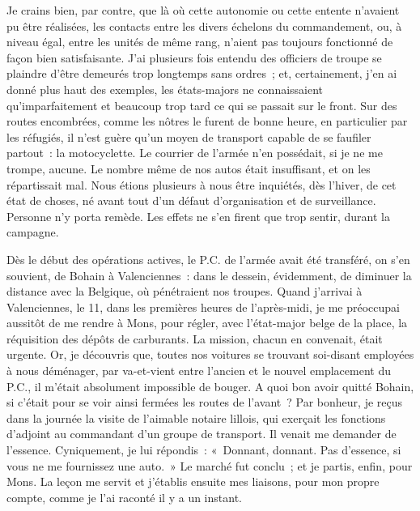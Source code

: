 \documentclass[french,twoside]{book} %
\begin{document}
Je crains bien, par contre, que là où cette autonomie ou cette entente n’avaient pu être réalisées, les contacts entre les divers échelons du commandement, ou, à niveau égal, entre les unités de même rang, n’aient pas toujours fonctionné de façon bien satisfaisante. J’ai plusieurs fois entendu des officiers de troupe se plaindre d’être demeurés trop longtemps sans ordres ; et, certainement, j’en ai donné plus haut des exemples, les états-majors ne   connaissaient qu’imparfaitement et beaucoup trop tard ce qui se passait sur le front. Sur des routes encombrées, comme les nôtres le furent de bonne heure, en particulier par les réfugiés, il n’est guère qu’un moyen de transport capable de se faufiler partout : la motocyclette. Le courrier de l’armée n’en possédait, si je ne me trompe, aucune. Le nombre même de nos autos était insuffisant, et on les répartissait mal. Nous étions plusieurs à nous être inquiétés, dès l’hiver, de cet état de choses, né avant tout d’un défaut d’organisation et de surveillance. Personne n’y porta remède. Les effets ne s’en firent que trop sentir, durant la campagne.\par
Dès le début des opérations actives, le P.C. de l’armée avait été transféré, on s’en souvient, de Bohain à Valenciennes : dans le dessein, évidemment, de diminuer la distance avec la Belgique, où pénétraient nos troupes. Quand j’arrivai à Valenciennes, le 11, dans les premières heures de l’après-midi, je me préoccupai aussitôt de me rendre à Mons, pour régler, avec l’état-major belge de la place, la réquisition des dépôts de carburants. La mission, chacun en convenait, était urgente. Or, je découvris que, toutes nos voitures se trouvant soi-disant employées à nous déménager, par va-et-vient entre l’ancien et le nouvel emplacement du P.C., il m’était absolument impossible de bouger. A quoi bon avoir quitté Bohain, si c’était pour se voir ainsi fermées les routes de l’avant ? Par bonheur, je reçus dans la journée la visite de l’aimable notaire lillois, qui exerçait les fonctions d’adjoint au commandant d’un groupe de transport. Il venait me demander de l’essence. Cyniquement, je lui répondis : « Donnant, donnant. Pas d’essence, si vous ne me fournissez une auto. » Le marché fut conclu ; et je partis, enfin, pour Mons. La leçon me servit et j’établis ensuite mes liaisons, pour mon propre compte, comme je l’ai raconté il y a un instant.\par
\end{document}
